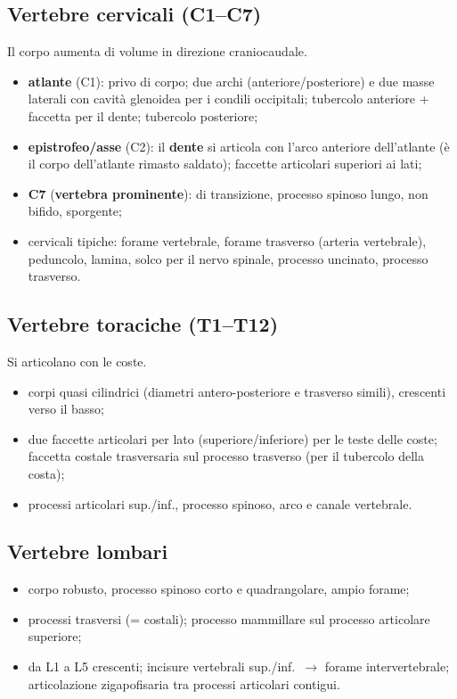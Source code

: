\subsection{Vertebre cervicali (C1--C7)}
Il corpo aumenta di volume in direzione craniocaudale.
\begin{itemize}
  \item \textbf{atlante} (C1): privo di corpo; due archi (anteriore/posteriore) e due masse
    laterali con cavità glenoidea per i condili occipitali; tubercolo anteriore + faccetta per il
    dente; tubercolo posteriore;
  \item \textbf{epistrofeo/asse} (C2): il \textbf{dente} si articola con l'arco anteriore
    dell'atlante (è il corpo dell'atlante rimasto saldato); faccette articolari superiori ai lati;
  \item \textbf{C7} (\textbf{vertebra prominente}): di transizione, processo spinoso lungo, non
    bifido, sporgente;
  \item cervicali tipiche: forame vertebrale, forame trasverso (arteria vertebrale), peduncolo,
    lamina, solco per il nervo spinale, processo uncinato, processo trasverso.
\end{itemize}

\subsection{Vertebre toraciche (T1--T12)}
Si articolano con le coste.
\begin{itemize}
  \item corpi quasi cilindrici (diametri antero-posteriore e trasverso simili), crescenti verso il
    basso;
  \item due faccette articolari per lato (superiore/inferiore) per le teste delle coste; faccetta
    costale trasversaria sul processo trasverso (per il tubercolo della costa);
  \item processi articolari sup./inf., processo spinoso, arco e canale vertebrale.
\end{itemize}

\subsection{Vertebre lombari}
\begin{itemize}
  \item corpo robusto, processo spinoso corto e quadrangolare, ampio forame;
  \item processi trasversi (= costali); processo mammillare sul processo articolare superiore;
  \item da L1 a L5 crescenti; incisure vertebrali sup./inf.\ $\rightarrow$ forame intervertebrale;
    articolazione zigapofisaria tra processi articolari contigui.
\end{itemize}

